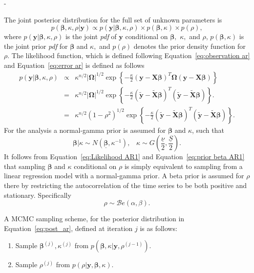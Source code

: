 -\documentclass[article]{jss}
\begin{document}
The joint posterior distribution for the full set of unknown parameters
is
\begin{equation} p(\bm{\beta},\kappa,\rho|\bm{y})\propto
  p(\bm{y}|\bm{\beta},\kappa,\rho)\times p(\bm{\beta},\kappa)\times
  p(\rho),\label{eq:post_ar}
\end{equation} where
$p(\bm{y}|\bm{\beta},\kappa,\rho)$ is the joint \emph{pdf} of $\bm{y}$
conditional on $\bm{\beta},$ $\kappa,$ and $\rho$,
$p(\bm{\beta},\kappa)$ is the joint prior \emph{pdf} for $\bm{\beta}$
and $\kappa,$ and $p(\rho)$ denotes the prior density function for
$\rho.$ The likelihood function, which is defined following
Equation~\ref{eq:observation ar} and Equation~\ref{eq:error ar} is defined as
follows
\begin{eqnarray}
  p(\bm{y}|\bm{\beta},\kappa,\rho) & \propto & \kappa^{n/2}|\bm{\Omega}|^{1/2}\exp\left\{ -\frac{\kappa}{2}\left(\bm{y}-\bm{X}\bm{\beta}\right)^{T}\bm{\Omega}\left(\bm{y}-\bm{X}\bm{\beta}\right)\right\} \nonumber \\
  & = & \kappa^{n/2}|\bm{\Omega}|^{1/2}\exp\left\{ -\frac{\kappa}{2}\left(\tilde{\bm{y}}-\tilde{\bm{X}}\bm{\beta}\right)^{T}\left(\tilde{\bm{y}}-\tilde{\bm{X}}\bm{\beta}\right)\right\} .\nonumber \\
  & = & \kappa^{n/2}\left(1-\rho^{2}\right)^{1/2}\exp\left\{
    -\frac{\kappa}{2}\left(\tilde{\bm{y}}-\tilde{\bm{X}}\bm{\beta}\right)^{T}\left(\tilde{\bm{y}}-\tilde{\bm{X}}\bm{\beta}\right)\right\}
  .
  \label{eq:Likelihood AR1}
\end{eqnarray} 
For the analysis a normal-gamma prior is assumed for $\bm{\beta}$ and
$\kappa$, such that
\begin{equation} \bm{\beta}|\kappa\sim
  N\left(\underline{\bm{\beta}},\kappa^{-1}\right),\,\,\,\,\,\kappa\sim
  G\left(\frac{\underline{\nu}}{2},\frac{\underline{S}}{2}\right).
  \label{eq:prior
    beta AR1}
\end{equation} It follows from Equation~\ref{eq:Likelihood AR1}
and Equation~\ref{eq:prior beta AR1} that sampling $\bm{\beta}$ and $\kappa$
conditional on $\rho$ is simply equivalent to sampling from a linear
regression model with a normal-gamma prior. A beta prior is assumed
for $\rho$ there by restricting the autocorrelation of the time series
to be both positive and stationary. Specifically\[
\rho\sim\mathcal{B}e\left(\alpha,\beta\right).\]

A MCMC sampling scheme, for the posterior distribution in
Equation~\ref{eq:post_ar}, defined at iteration $j$ is as follows:
\begin{enumerate}
\item Sample $\bm{\beta}^{(j)},\kappa^{(j)}$ from
  $p(\bm{\beta},\kappa|\bm{y},\rho^{(j-1)}).$
\item Sample $\rho^{(j)}$ from $p(\rho|\bm{y},\bm{\beta},\kappa).$
\end{enumerate}
\end{document}
